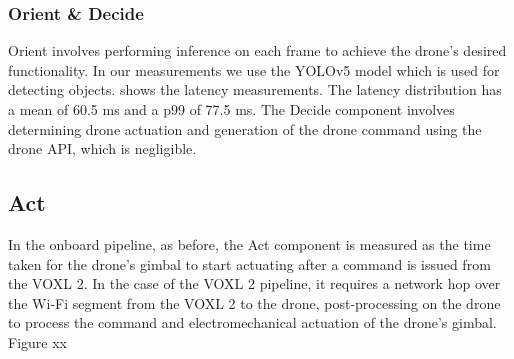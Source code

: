 \subsubsection*{Orient \& Decide}

Orient involves performing inference on each frame to achieve the drone's
desired functionality. In our measurements we use the YOLOv5 model which is
used for detecting objects.  shows the latency
measurements.  The latency distribution has a mean of 60.5 ms and a p99 of 77.5
ms. The Decide component involves determining drone actuation and generation of
the drone command using the drone API, which is negligible.

\subsection*{Act}

In the onboard pipeline, as before, the Act component is measured as the time
taken for the drone's gimbal to start actuating after a command is issued from
the VOXL 2. In the case of the VOXL 2 pipeline, it requires a network hop over
the Wi-Fi segment from the VOXL 2 to the drone, post-processing on the drone to
process the command and electromechanical actuation of the drone's gimbal.
Figure xx

